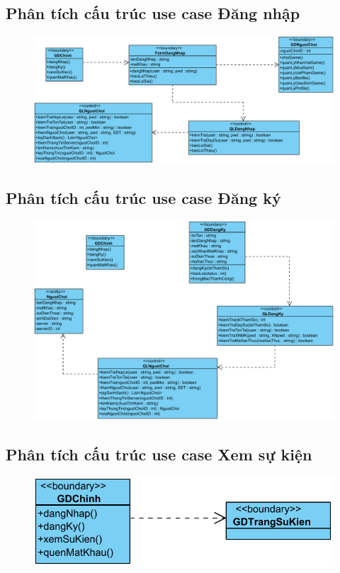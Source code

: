 \documentclass[3p]{elsarticle}
\begin{document}
\subsection{Phân tích cấu trúc use case Đăng nhập}
\begin{figure}[!htbp]
	\hspace*{-.5in}
	\centering
	\includegraphics[scale=.55]{images/structure-pdfs/guest/Login.pdf}
\end{figure}
\newpage

\subsection{Phân tích cấu trúc use case Đăng ký}
\begin{figure}[!htbp]
	\hspace*{-.5in}
	\centering
	\includegraphics[scale=.55]{images/structure-pdfs/guest/Signup.pdf}
\end{figure}


\subsection{Phân tích cấu trúc use case Xem sự kiện}
\begin{figure}[!htbp]
	\hspace*{-.5in}
	\centering
	\includegraphics[scale=.55]{images/structure-pdfs/guest/viewEvents.pdf}
\end{figure}
\newpage
\end{document}
